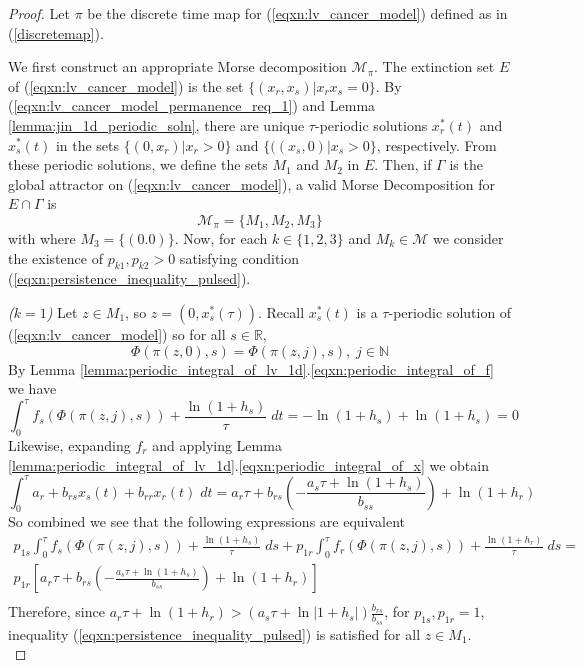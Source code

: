 \documentclass{article}
\theoremstyle{definition}
\newcommand{\R}{{\mathbb{R}}}
\newcommand{\N}{{\mathbb{N}}}
\begin{document}
\begin{proof}
    Let $\pi$ be the discrete time map for (\ref{eqxn:lv_cancer_model}) defined as in (\ref{discretemap}).
    
    We first construct an appropriate Morse decomposition $\mathcal{M}_\pi$. The extinction set $E$ of (\ref{eqxn:lv_cancer_model}) is the set $\{(x_r,x_s)| x_rx_s=0\}$. By (\ref{eqxn:lv_cancer_model_permanence_req_1}) and Lemma \ref{lemma:jin_1d_periodic_soln}, there are unique $\tau$-periodic solutions $x_r^*(t)$ and $x_s^*(t)$ in the sets $\{(0, x_r)|x_r>0\}$ and $\{((x_s,0)|x_s>0\}$, respectively.  From these periodic solutions, we define the sets $M_1$ and $M_2$ in $E$. Then, if $\Gamma$ is the global attractor on (\ref{eqxn:lv_cancer_model}), a valid Morse Decomposition for $E\cap\Gamma$ is  
    $$
    \mathcal{M}_\pi = \{ M_1, M_2, M_3 \}
    $$ with
    where $M_3=\{(0.0)\}$.
    Now, for each $k \in \{1, 2, 3\}$ and $M_k \in \mathcal{M}$ we consider the existence of $p_{k1},p_{k2} >0$ satisfying condition (\ref{eqxn:persistence_inequality_pulsed}).

    \textit{($k = 1$)} 
    Let  $z \in M_1$, so $z = (0,x_s^*(\tau))$. Recall $x_s^*(t)$ is a $\tau$-periodic solution of (\ref{eqxn:lv_cancer_model}) so for all $s \in \R$,
    $$
    \Phi(\pi(z,0),s) = \Phi(\pi(z,j),s), \; j\in \N
    $$ By Lemma \ref{lemma:periodic_integral_of_lv_1d}.\ref{eqxn:periodic_integral_of_f} we have
    $$
    \int_0^\tau f_s(\Phi (\pi(z,j),s)) + \frac{\ln{(1+h_s)}}{\tau} \; dt = -\ln{(1+h_s)} + \ln{(1+h_s)} = 0
    $$
    Likewise, expanding $f_r$ and applying Lemma \ref{lemma:periodic_integral_of_lv_1d}.\ref{eqxn:periodic_integral_of_x} we obtain
    $$
    \int_0^\tau a_r + b_{rs}x_s(t) +b_{rr}x_r(t) \; dt = a_r\tau + b_{rs}\left(-\frac{a_s\tau + \ln{(1+h_s)}}{b_{ss}}\right) + \ln{(1 + h_r)}
    $$ So combined we see that the following expressions are equivalent
    \begin{equation*}
        \begin{split}
            p_{1s} \int_0^\tau f_s(\Phi (\pi(z,j),s)) + \frac{\ln{(1+h_s)}}{\tau} \; ds + p_{1r} \int_0^\tau f_r(\Phi (\pi(z,j),s)) + \frac{\ln{(1+h_r)}}{\tau} \; ds=\\
            p_{1r} \left[a_r\tau + b_{rs}\left(-\frac{a_s\tau + \ln{(1+h_s)}}{b_{ss}}\right) + \ln{(1 + h_r)} \right]\\
        \end{split}
    \end{equation*}
    Therefore, since $a_r\tau + \ln{(1 + h_r)} > \left(a_s\tau + \ln{|1 + h_s|}\right)\frac{b_{rs}}{b_{ss}}$, for $p_{1s}, p_{1r} = 1$, inequality (\ref{eqxn:persistence_inequality_pulsed}) is satisfied for all $z \in M_1$. \\
    

\end{proof}
\end{document}
